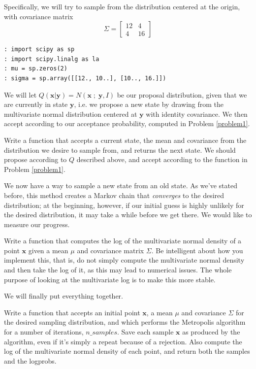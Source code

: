 Specifically, we will try to sample from the distribution centered at the origin, with covariance matrix
$$\Sigma = \left[ \begin{array}{cc} 12 & 4 \\ 4 & 16 \end{array} \right]$$

\begin{lstlisting}[style=python]
: import scipy as sp
: import scipy.linalg as la
: mu = sp.zeros(2)
: sigma = sp.array([[12., 10..], [10.., 16.]])
\end{lstlisting}

We will let $Q(\mathbf{x} | \mathbf{y}) = N(\mathbf{x} \; ; \; \mathbf{y}, I)$ be our proposal distribution, given that we are currently in state $\mathbf{y}$, i.e. we propose a new state by drawing from the multivariate normal distribution centered at $\mathbf{y}$ with identity covariance. We then accept according to our acceptance probability, computed in Problem \ref{problem1}.

\begin{problem}
Write a function that accepts a current state, the mean and covariance from the distribution we desire to sample from, and returns the next state. We should propose according to $Q$ described above, and accept according to the function in Problem \ref{problem1}.
\end{problem}

We now have a way to sample a new state from an old state. As we've stated before, this method creates a Markov chain that \emph{converges} to the desired distribution; at the beginning, however, if our initial guess is highly unlikely for the desired distribution, it may take a while before we get there. We would like to measure our progress.

\begin{problem}
Write a function that computes the log of the multivariate normal density of a point $\mathbf{x}$ given a mean $\mu$ and covariance matrix $\Sigma$. Be intelligent about how you implement this, that is, do not simply compute the multivariate normal density and then take the log of it, as this may lead to numerical issues. The whole purpose of looking at the multivariate log is to make this more stable.
\end{problem}

We will finally put everything together.

\begin{problem}
Write a function that accepts an initial point $\mathbf{x}$, a mean $\mu$ and covariance $\Sigma$ for the desired sampling distribution, and which performs the Metropolis algorithm for a number of iterations, $n\_samples$. Save each sample $\mathbf{x}$ as produced by the algorithm, even if it's simply a repeat because of a rejection. Also compute the log of the multivariate normal density of each point, and return both the samples and the logprobs.
\end{problem}

